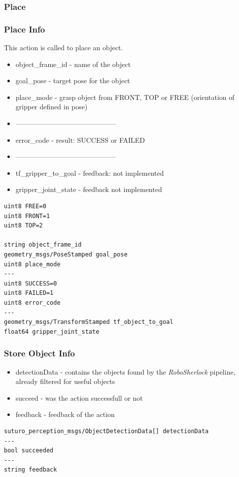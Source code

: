 \documentclass[main.tex]{subfiles}
\begin{document}
				\subsubsection{Place}
				\label{msg_place}
				\subsubsection{Place Info}
				This action is called to place an object.
				\begin{itemize}
					\item object\_frame\_id - name of the object
					\item goal\_pose - target pose for the object
					\item place\_mode - grasp object from FRONT, TOP or FREE (orientation of gripper defined in pose)
					\item --------------------------------------------
					\item error\_code - result: SUCCESS or FAILED
					\item --------------------------------------------
					\item tf\_gripper\_to\_goal - feedback: not implemented
					\item gripper\_joint\_state - feedback not implemented
				\end{itemize}
					\begin{lstlisting}
uint8 FREE=0
uint8 FRONT=1
uint8 TOP=2
		
string object_frame_id
geometry_msgs/PoseStamped goal_pose
uint8 place_mode
---
uint8 SUCCESS=0
uint8 FAILED=1
uint8 error_code
---
geometry_msgs/TransformStamped tf_object_to_goal
float64 gripper_joint_state
\end{lstlisting}
				\subsubsection{Store Object Info}
				\label{msg_store_object_info}
				\begin{itemize}
					\item detectionData - contains the objects found by the \textit{RoboSherlock} pipeline, already filtered for useful objects
					\item succeed - was the action successfull or not
					\item feedback - feedback of the action 
				\end{itemize}
					\begin{lstlisting}
suturo_perception_msgs/ObjectDetectionData[] detectionData
---
bool succeeded
---
string feedback
\end{lstlisting}
\end{document}
